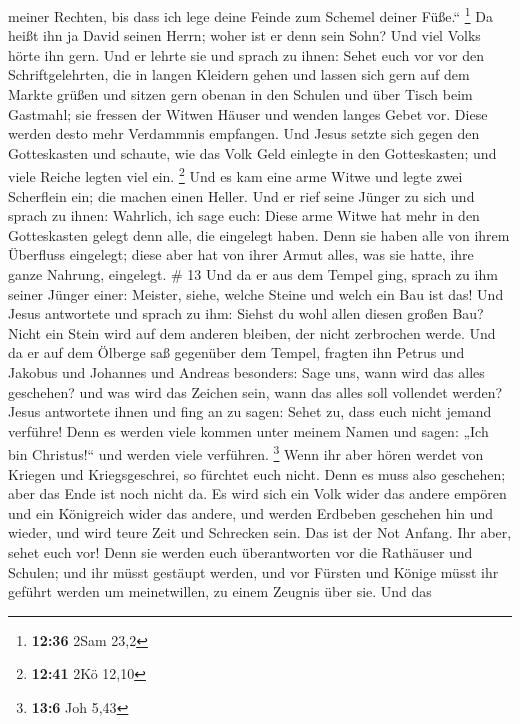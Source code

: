 meiner Rechten, bis dass ich lege deine Feinde zum Schemel deiner
Füße.`` \footnote{\textbf{12:36} 2Sam 23,2}  Da heißt ihn
ja David seinen Herrn; woher ist er denn sein Sohn? Und viel Volks hörte
ihn gern.  Und er lehrte sie und sprach zu ihnen: Sehet
euch vor vor den Schriftgelehrten, die in langen Kleidern gehen und
lassen sich gern auf dem Markte grüßen  und sitzen gern
obenan in den Schulen und über Tisch beim Gastmahl;  sie
fressen der Witwen Häuser und wenden langes Gebet vor. Diese werden
desto mehr Verdammnis empfangen.  Und Jesus setzte sich
gegen den Gotteskasten und schaute, wie das Volk Geld einlegte in den
Gotteskasten; und viele Reiche legten viel ein. \footnote{\textbf{12:41}
  2Kö 12,10}  Und es kam eine arme Witwe und legte zwei
Scherflein ein; die machen einen Heller.  Und er rief seine
Jünger zu sich und sprach zu ihnen: Wahrlich, ich sage euch: Diese arme
Witwe hat mehr in den Gotteskasten gelegt denn alle, die eingelegt
haben.  Denn sie haben alle von ihrem Überfluss eingelegt;
diese aber hat von ihrer Armut alles, was sie hatte, ihre ganze Nahrung,
eingelegt. \# 13  Und da er aus dem Tempel ging, sprach zu
ihm seiner Jünger einer: Meister, siehe, welche Steine und welch ein Bau
ist das!  Und Jesus antwortete und sprach zu ihm: Siehst du
wohl allen diesen großen Bau? Nicht ein Stein wird auf dem anderen
bleiben, der nicht zerbrochen werde.  Und da er auf dem
Ölberge saß gegenüber dem Tempel, fragten ihn Petrus und Jakobus und
Johannes und Andreas besonders:  Sage uns, wann wird das
alles geschehen? und was wird das Zeichen sein, wann das alles soll
vollendet werden?  Jesus antwortete ihnen und fing an zu
sagen: Sehet zu, dass euch nicht jemand verführe!  Denn es
werden viele kommen unter meinem Namen und sagen: „Ich bin Christus!{}``
und werden viele verführen. \footnote{\textbf{13:6} Joh 5,43}
 Wenn ihr aber hören werdet von Kriegen und Kriegsgeschrei,
so fürchtet euch nicht. Denn es muss also geschehen; aber das Ende ist
noch nicht da.  Es wird sich ein Volk wider das andere
empören und ein Königreich wider das andere, und werden Erdbeben
geschehen hin und wieder, und wird teure Zeit und Schrecken sein. Das
ist der Not Anfang.  Ihr aber, sehet euch vor! Denn sie
werden euch überantworten vor die Rathäuser und Schulen; und ihr müsst
gestäupt werden, und vor Fürsten und Könige müsst ihr geführt werden um
meinetwillen, zu einem Zeugnis über sie.  Und das
